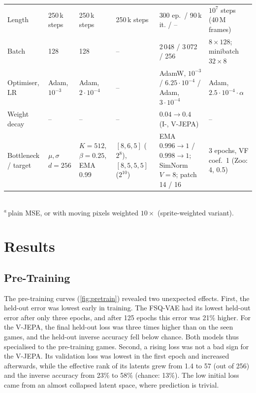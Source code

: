 \documentclass[runningheads]{llncs}
\begin{document}
\begin{table}[!htbp]
\begin{tabular}{@{}Y{1.3cm}Y{1.7cm}Y{1.7cm}Y{1.7cm}Y{2.6cm}Y{1.8cm}@{}}
Length & 250\,k steps & 250\,k steps & 250\,k steps & 300 ep.\ / 90\,k it. / -- & $10^7$ steps (40\,M frames) \\
Batch & 128 & 128 & -- & 2\,048 / 3\,072 / 256 & $8\times128$; minibatch $32\times8$ \\
Optimiser, LR & Adam, $10^{-3}$ & Adam, $2{\cdot}10^{-4}$ & -- & AdamW, $10^{-3}$ / $6.25{\cdot}10^{-4}$ / Adam, $3{\cdot}10^{-4}$ &
  Adam, $2.5{\cdot}10^{-4}\cdot\alpha$ \\
Weight decay & -- & -- & -- & $0.04\to0.4$ (I-, V-JEPA) & -- \\
Bottleneck / target & $\mu, \sigma$ $d{=}256$ & $K{=}512$, $\beta{=}0.25$, EMA 0.99 & $[8,6,5]$ ($2^8$), $[8,5,5,5]$ ($2^{10}$) &
  EMA $0.996\to1$ / $0.998\to1$; SimNorm $V{=}8$; patch 14 / 16 & 3 epochs, VF coef.\ 1 (Zoo: 4, 0.5) \\
\bottomrule
\end{tabular}\\[2pt]
{\scriptsize $^{a}$\,plain MSE, or with moving pixels weighted $10\times$ (sprite-weighted variant).}
\end{table}

\section{Results}
\label{sec:results}

\FloatBarrier
\subsection{Pre-Training}
\label{sec:pretrain-res}

The pre-training curves (\cref{fig:pretrain}) revealed two unexpected effects. First, the
held-out error was lowest early in training. The FSQ-VAE had its lowest
held-out error after only three epochs, and after 125 epochs this error was 21\% higher. For the
V-JEPA, the final held-out loss was three times higher than on the seen games, and the held-out
inverse accuracy fell below chance. Both models thus specialised to the pre-training games. Second, a rising loss was not a bad sign for the V-JEPA. Its validation
loss was lowest in the first epoch and increased afterwards, while the effective rank of its
latents grew from 1.4 to 57 (out of 256) and the inverse accuracy from 23\% to 58\% (chance:
13\%). The low initial loss came from an almost collapsed latent space, where prediction is trivial.
\end{document}
